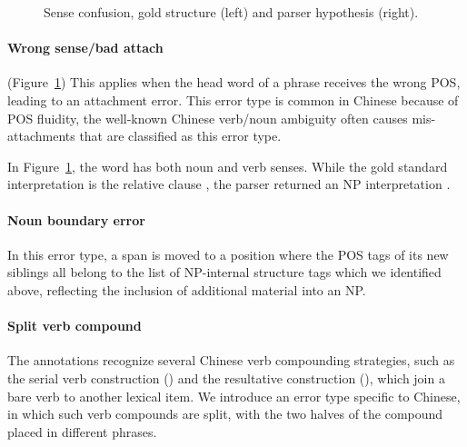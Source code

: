 \begin{figure}
\centering
  \caption{Sense confusion, gold structure (left) and parser hypothesis (right).}\label{fig:sense}
\end{figure}

\paragraph{Wrong sense/bad attach} (Figure~\ref{fig:sense})
This applies
when the head word of a phrase receives the wrong POS, leading to an attachment
error.  This error type is common in Chinese because of POS fluidity, \myeg the
well-known Chinese verb/noun ambiguity often causes mis-attachments that are
classified as this error type.

In Figure~\ref{fig:sense}, the word \mbox{} has both noun and
verb senses. While the gold standard interpretation is the relative clause
\mbox{}, the parser returned an NP
interpretation \mbox{}.

\paragraph{Noun boundary error}  In this error type, a span is moved to a
position where the POS tags of its new siblings all belong to the
list of NP-internal structure tags which we identified above, reflecting
the inclusion of additional material into an NP.

\paragraph{Split verb compound} The \pctb annotations recognize several
Chinese verb compounding strategies, such as the serial verb construction
(\mbox{}) and the resultative construction
(\mbox{}), which join a bare verb to another
lexical item.  We introduce an error type specific to Chinese, in which such
verb compounds are split, with the two halves of the compound placed in
different phrases.

